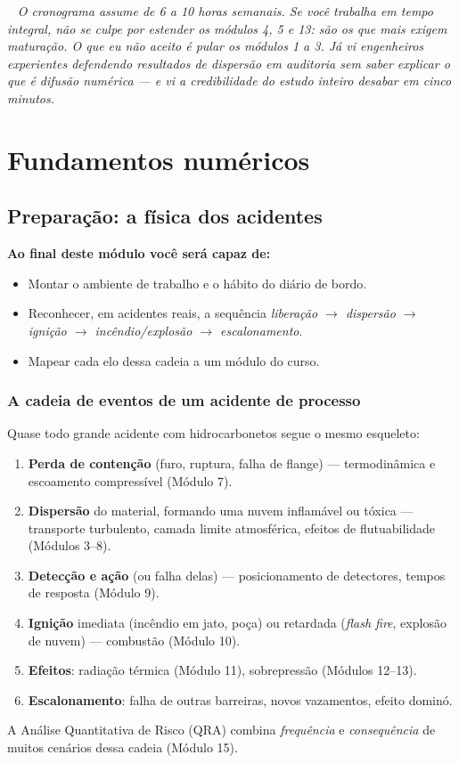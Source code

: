 \documentclass[10pt,a4paper,twocolumn,openany]{report}
\newcommand{\lead}[2]{\par\medskip\noindent{\color{#1}\bfseries #2}\ }
\newenvironment{conceito}[1]{\section{#1}}{\par}
\newenvironment{professor}{\lead{laranja}{Nota do professor.}\itshape}{\par\medskip}
\newcommand{\objetivos}{\noindent\textbf{Ao final deste módulo você será capaz de:}}
\begin{document}
\begin{professor}
O cronograma assume de 6 a 10 horas semanais. Se você trabalha em tempo
integral, não se culpe por estender os módulos 4, 5 e 13: são os que mais
exigem maturação. O que eu \emph{não} aceito é pular os módulos 1 a 3. Já vi
engenheiros experientes defendendo resultados de dispersão em auditoria sem
saber explicar o que é difusão numérica --- e vi a credibilidade do estudo
inteiro desabar em cinco minutos.
\end{professor}

\part{Fundamentos numéricos}

\setcounter{chapter}{-1}
\chapter{Preparação: a física dos acidentes}

\objetivos
\begin{itemize}
  \item Montar o ambiente de trabalho e o hábito do diário de bordo.
  \item Reconhecer, em acidentes reais, a sequência
        \emph{liberação $\rightarrow$ dispersão $\rightarrow$ ignição
        $\rightarrow$ incêndio/explosão $\rightarrow$ escalonamento}.
  \item Mapear cada elo dessa cadeia a um módulo do curso.
\end{itemize}

\begin{conceito}{A cadeia de eventos de um acidente de processo}
Quase todo grande acidente com hidrocarbonetos segue o mesmo esqueleto:
\begin{enumerate}
  \item \textbf{Perda de contenção} (furo, ruptura, falha de flange) --- termodinâmica
        e escoamento compressível (Módulo 7).
  \item \textbf{Dispersão} do material, formando uma nuvem inflamável ou tóxica ---
        transporte turbulento, camada limite atmosférica, efeitos de
        flutuabilidade (Módulos 3--8).
  \item \textbf{Detecção e ação} (ou falha delas) --- posicionamento de
        detectores, tempos de resposta (Módulo 9).
  \item \textbf{Ignição} imediata (incêndio em jato, poça) ou retardada
        (\emph{flash fire}, explosão de nuvem) --- combustão (Módulo 10).
  \item \textbf{Efeitos}: radiação térmica (Módulo 11), sobrepressão
        (Módulos 12--13).
  \item \textbf{Escalonamento}: falha de outras barreiras, novos vazamentos,
        efeito dominó.
\end{enumerate}
A Análise Quantitativa de Risco (QRA) combina \emph{frequência} e
\emph{consequência} de muitos cenários dessa cadeia (Módulo 15).
\end{conceito}
\end{document}
